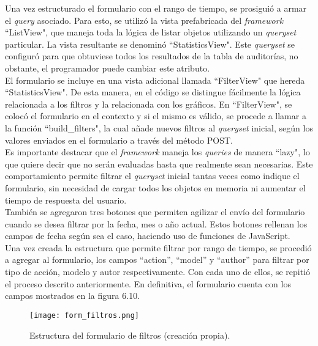 Una vez estructurado el formulario con el rango de tiempo, se prosiguió a armar el \textit{query} asociado. Para esto, se utilizó la vista prefabricada del \textit{framework} “ListView", que maneja toda la lógica de listar objetos utilizando un \textit{queryset} particular. La vista resultante se denominó “StatisticsView". Este \textit{queryset}  se configuró para que obtuviese todos los resultados de la tabla de auditorías, no obstante, el programador puede cambiar este atributo.\\

El formulario se incluye en una vista adicional llamada “FilterView" que hereda “StatisticsView". De esta manera, en el código se distingue fácilmente la lógica relacionada a los filtros y la relacionada con los gráficos. En “FilterView", se colocó el formulario en el contexto y si el mismo es válido, se procede a llamar a la función “build\_filters", la cual añade nuevos filtros al \textit{queryset} inicial, según los valores enviados en el formulario a través del método POST. \\

Es importante destacar que el \textit{framework} maneja los \textit{queries} de manera “lazy", lo que quiere decir que no serán evaluadas hasta que realmente sean necesarias. Este comportamiento permite filtrar el \textit{queryset} inicial tantas veces como indique el formulario, sin necesidad de cargar todos los objetos en memoria ni aumentar el tiempo de respuesta del usuario.\\

También se agregaron tres botones que permiten agilizar el envío del formulario cuando se desea filtrar por la fecha, mes o año actual. Estos botones rellenan los campos de fecha según sea el caso, haciendo uso de funciones de JavaScript.\\

Una vez creada la estructura que permite filtrar por rango de tiempo, se procedió a agregar al formulario, los campos “action”, “model” y “author” para filtrar por tipo de acción, modelo y autor respectivamente. Con cada uno de ellos, se repitió el proceso descrito anteriormente. En definitiva, el formulario cuenta con los campos mostrados en la figura 6.10.

\begin{figure}[h]
    \centering
    \texttt{[image: form\_filtros.png]}
    \caption{Estructura del formulario de filtros (creación propia).}
    \label{fig:figura6.10}
\end{figure}

